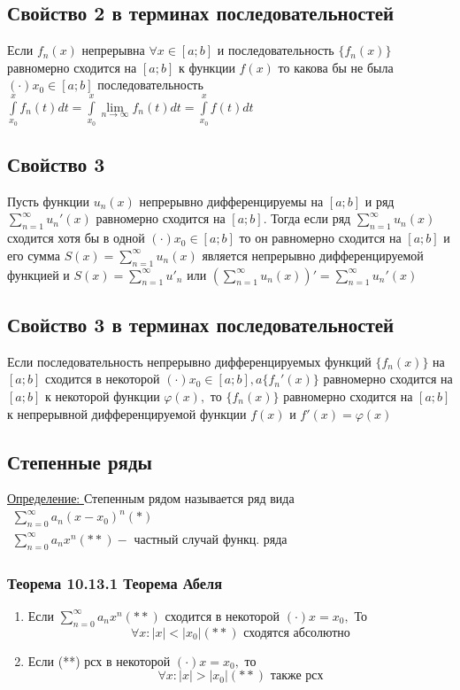 \documentclass[12pt]{article}
\let\oldint\int
\let\oldsum\sum
\let\oldlim\lim
\renewcommand{\int}{\oldint\limits}
\renewcommand{\sum}{\oldsum\limits}
\renewcommand{\lim}{\oldlim\limits}
\begin{document}
    \subsection*{Свойство 2 в терминах последовательностей}
    Если $f_n(x)$ непрерывна $\forall x \in [a;b]$ и последовательность $\{f_n(x)\}$ равномерно сходится на 
    $[a;b]$ к функции $f(x)$ то какова бы не была $(\cdot) x_0 \in [a;b]$ последовательность
    $\int_{x_0}^x f_n(t)dt=\int_{x_0}^{x} \lim_{n \to \infty} f_n(t)dt = \int_{x_0}^{x} f(t)dt$

    \subsection*{Свойство 3} 
    Пусть функции $u_n(x)$ непрерывно дифференцируемы на $[a;b]$ и ряд $\sum_{n=1}^{\infty} u_n'(x)$ равномерно
    сходится на $[a;b]$. Тогда если ряд $\sum_{n=1}^{\infty} u_n(x)$ сходится хотя бы в одной
    $(\cdot) x_0 \in [a;b]$ то он равномерно сходится на $[a;b]$ и его сумма $S(x)=\sum_{n=1}^{\infty}u_n(x)$
    является непрерывно дифференцируемой функцией и $S(x)=\sum_{n=1}^{\infty}u'_n$ или
    $(\sum_{n=1}^{\infty}u_n(x))'=\sum_{n=1}^{\infty}u_n'(x)$

    \subsection*{Свойство 3 в терминах последовательностей}
    Если последовательность непрерывно дифференцируемых функций $\{f_n(x)\}$ на $[a;b]$ сходится в 
    некоторой $(\cdot) x_0 \in [a;b], a \{f_n'(x)\}$ равномерно сходится на $[a;b]$ к некоторой функции
    $\varphi(x),$ то $\{f_n(x)\}$ равномерно сходится на $[a;b]$ к непрерывной дифференцируемой функции $f(x)$ и
    $f'(x)=\varphi(x)$

    \subsection{Степенные ряды}

    \underline{Определение: } Степенным рядом называется ряд вида 
    $\begin{matrix}
      \sum_{n=0}^{\infty} a_n(x-x_0)^n (*)\\
      \sum_{n=0}^{\infty} a_n x^n (**) - \text{ частный случай функц. ряда}
    \end{matrix}$

    \subsubsection*{Теорема 10.13.1 Теорема Абеля}\label{th:10.13.1}
    \par\noindent
    \begin{enumerate}
      \item Если $\sum_{n=0}^{\infty} a_n x^n (**)$ сходится в некоторой $(\cdot) x=x_0,$ То
      \[\forall x: |x|< |x_0|(**)\text{ сходятся абсолютно}\]
      \item Если (**) рсх в некоторой $(\cdot) x=x_0,$ то
      \[\forall x: |x|>|x_0| (**)\text{ также рсх}\]
    \end{enumerate}
\end{document}
